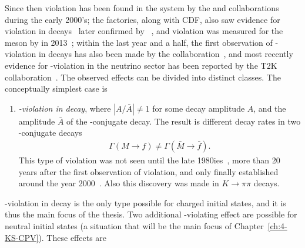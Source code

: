 Since then \CP violation has been found in the \Bz system by the \babar and \belle collaborations~\cite{boutignyObservationMathitCPViolation2001,bellecollaborationObservationLargeMathitCP2001} during the early 2000's; the \B factories, along with CDF, also saw evidence for \CP violation in \Bpm decays~\cite{abeStudyCPCP2006,bellecollaborationEvidenceSuppressedDecay2011,thebabarcollaborationMeasurementCPObservables2010,thebabarcollaborationSearchEnsuremathRightarrowu2010,cdfcollaborationMeasurementsBranchingFraction2010,cdfcollaborationMeasurementsBranchingFraction2011} later confirmed by \lhcb~\cite{LHCb-PAPER-2012-001}, and \CP violation was measured for the \Bs meson by \lhcb in 2013~\cite{LHCb-PAPER-2013-018}; within the last year and a half, the first observation of \CP-violation in \Dz decays has also been made by the \lhcb collaboration~\cite{LHCb-PAPER-2019-006}, and most recently evidence for \CP-violation in the neutrino sector has been reported by the T2K collaboration~\cite{abeConstraintMatterAntimatter2020}. The observed effects can be divided into distinct classes. The conceptually simplest case is
\begin{enumerate}
    \item \emph{\CP-violation in decay}, where $|A / \bar A| \neq 1$ for some decay amplitude $A$, and the amplitude $\bar A$ of the \CP-conjugate decay. The result is different decay rates in two \CP-conjugate decays
    \begin{align}
        \Gamma (M\to f) \neq \Gamma (\bar M \to \bar f).
    \end{align}
    This type of \CP violation was not seen until the late 1980ies~\cite{gibbonsMeasurementCPviolationParameter1993,barrNewMeasurementDirect1993}, more than 20 years after the first observation of \CP violation, and only finally established around the year 2000~\cite{batleyPrecisionMeasurementDirect2002,ktevcollaborationMeasurementsDirectMathrmCP2003}. Also this discovery was made in $K\to\pi\pi$ decays. 
\end{enumerate}
\CP-violation in decay is the only type possible for charged initial states, and it is thus the main focus of the thesis. Two additional \CP-violating effect are possible for neutral initial states (a situation that will be the main focus of Chapter~\ref{ch:4-KS-CPV}). These effects are

